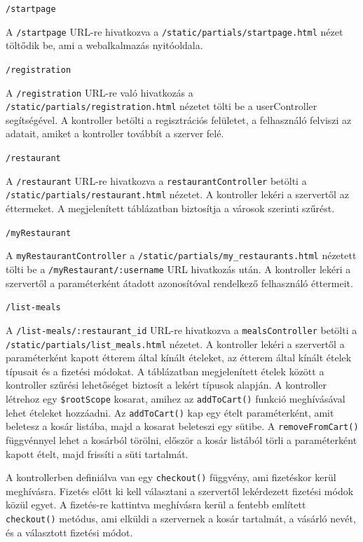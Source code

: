 \bigskip

\noindent \texttt{/startpage}

A \texttt{/startpage} URL-re hivatkozva a \texttt{/static/partials/startpage.html} nézet töltődik be, ami a webalkalmazás nyitóoldala.

\bigskip

\noindent \texttt{/registration}

A \texttt{/registration} URL-re való hivatkozás a \texttt{/static/partials/registration.html} nézetet tölti be a userController segítségével. A kontroller betölti a regisztrációs felületet, a felhasználó felviszi az adatait, amiket a kontroller továbbít a szerver felé.

\bigskip

\noindent \texttt{/restaurant}

A \texttt{/restaurant} URL-re hivatkozva a \texttt{restaurantController} betölti a \texttt{/static/partials/restaurant.html} nézetet. A kontroller lekéri a szervertől az éttermeket. A megjelenített táblázatban biztosítja a városok szerinti szűrést.

\bigskip

\noindent \texttt{/myRestaurant}

A \texttt{myRestaurantController} a \texttt{/static/partials/my\_restaurants.html} nézetett tölti be a \texttt{/myRestaurant/:username} URL hivatkozás után. A kontroller lekéri a szervertől a paraméterként átadott azonosítóval rendelkező felhasználó éttermeit.

\bigskip

\noindent \texttt{/list-meals}

A \texttt{/list-meals/:restaurant\_id} URL-re hivatkozva a \texttt{mealsController} betölti a \texttt{/static/partials/list\_meals.html} nézetet. A kontroller lekéri a szervertől a paraméterként kapott étterem által kínált ételeket, az étterem által kínált ételek típusait és a fizetési módokat. A táblázatban megjelenített ételek között a kontroller szűrési lehetőséget biztosít a lekért típusok alapján. A kontroller létrehoz egy \texttt{\$rootScope} kosarat, amihez az \texttt{addToCart()} funkció meghívásával lehet ételeket hozzáadni. Az \texttt{addToCart()} kap egy ételt paraméterként, amit beletesz a kosár listába, majd a kosarat beleteszi egy sütibe. A \texttt{removeFromCart()} függvénnyel lehet a kosárból törölni, először a kosár listából törli a paraméterként kapott ételt, majd frissíti a süti tartalmát.

A kontrollerben definiálva van egy \texttt{checkout()} függvény, ami fizetéskor kerül meghívásra. Fizetés előtt ki kell választani a szervertől lekérdezett fizetési módok közül egyet. A fizetés-re kattintva meghívásra kerül a fentebb említett \texttt{checkout()} metódus, ami elküldi a szervernek a kosár tartalmát, a vásárló nevét, és a választott fizetési módot.

